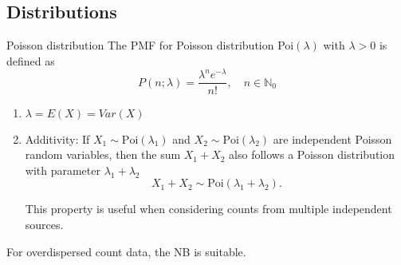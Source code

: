     
    

\subsection{Distributions}
\begin{note}
    {Poisson distribution}\label{note:poisson-distribution}
    The \gls{PMF} for Poisson distribution Poi\((\lambda)\) with \(\lambda > 0\) is defined as
    \begin{equation}\label{eq:poisson-pmf}
        P(n;\lambda) = \frac{\lambda^n e^{-\lambda}}{n!}, \quad n \in \mathbb{N}_0
    \end{equation}
    \begin{enumerate}
        \item $\lambda = E(X) = Var(X)$ 
        \item Additivity: If $X_1 \sim \text{Poi}(\lambda_1)$ and $X_2 \sim \text{Poi}(\lambda_2)$ are independent Poisson random variables, then the sum $X_1 + X_2$ also follows a Poisson distribution with parameter $\lambda_1 + \lambda_2$
        \begin{equation}
            X_1 + X_2 \sim \text{Poi}(\lambda_1 + \lambda_2).
        \end{equation}
        
        This property is useful when considering counts from multiple independent sources.
    \end{enumerate}
\end{note}

For overdispersed count data, the \gls{NB} is suitable. 

